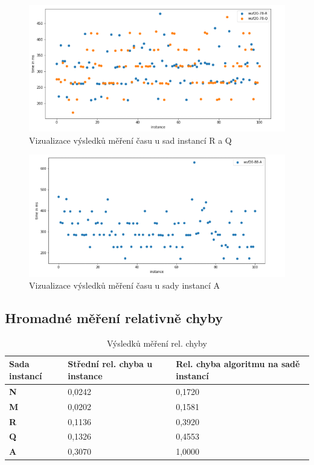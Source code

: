 \documentclass{article}
\begin{document}
\begin{figure}[H]
    \centering
    \includegraphics[width=1.2\textwidth]{screenshot_1293}
    \caption{Vizualizace výsledků měření času u sad instancí R a Q}
    \label{fig:se_t2}
\end{figure}

\begin{figure}[H]
    \centering
    \includegraphics[width=1.2\textwidth]{screenshot_1295}
    \caption{Vizualizace výsledků měření času u sady instancí A}
    \label{fig:se_t3}
\end{figure}

\newpage
\subsection{Hromadné měření relativně chyby}
\begin{table}[H]
\begin{tabular}{|l|l|l|}
\hline
\textbf{Sada instancí} & \textbf{Střední rel. chyba u instance} & \textbf{Rel. chyba algoritmu na sadě instancí} \\ \hline
\textbf{N} & 0,0242 & 0,1720 \\ \hline
\textbf{M} & 0,0202 & 0,1581 \\ \hline
\textbf{R} & 0,1136 & 0,3920 \\ \hline
\textbf{Q} & 0,1326 & 0,4553 \\ \hline
\textbf{A} & 0,3070 & 1,0000 \\ \hline
\end{tabular}
\caption{Výsledků měření rel. chyby}
\label{fig:se_errors}
\end{table}
\end{document}
